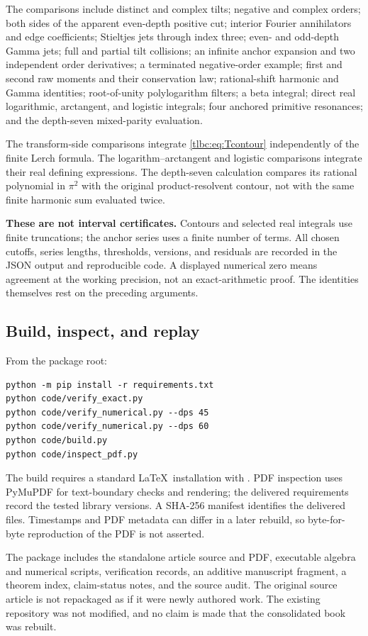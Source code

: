 \documentclass[11pt,letterpaper]{article}
\numberwithin{equation}{section}
\theoremstyle{definition}\newtheorem{definition}[theorem]{Definition}
\theoremstyle{remark}\newtheorem{remark}[theorem]{Remark}
\newcommand{\src}[1]{\texttt{\small\detokenize{#1}}}
\begin{document}
The comparisons include distinct and complex tilts; negative and complex orders; both sides of the apparent even-depth positive cut; interior Fourier annihilators and edge coefficients; Stieltjes jets through index three; even- and odd-depth Gamma jets; full and partial tilt collisions; an infinite anchor expansion and two independent order derivatives; a terminated negative-order example; first and second raw moments and their conservation law; rational-shift harmonic and Gamma identities; root-of-unity polylogarithm filters; a beta integral; direct real logarithmic, arctangent, and logistic integrals; four anchored primitive resonances; and the depth-seven mixed-parity evaluation.

The transform-side comparisons integrate \eqref{tlbc:eq:Tcontour} independently of the finite Lerch formula. The logarithm--arctangent and logistic comparisons integrate their real defining expressions. The depth-seven calculation compares its rational polynomial in $\pi^2$ with the original product-resolvent contour, not with the same finite harmonic sum evaluated twice.

\textbf{These are not interval certificates.} Contours and selected real integrals use finite truncations; the anchor series uses a finite number of terms. All chosen cutoffs, series lengths, thresholds, versions, and residuals are recorded in the JSON output and reproducible code. A displayed numerical zero means agreement at the working precision, not an exact-arithmetic proof. The identities themselves rest on the preceding arguments.

\subsection{Build, inspect, and replay}
From the package root:
\begin{verbatim}
python -m pip install -r requirements.txt
python code/verify_exact.py
python code/verify_numerical.py --dps 45
python code/verify_numerical.py --dps 60
python code/build.py
python code/inspect_pdf.py
\end{verbatim}
The build requires a standard \LaTeX\ installation with \src{pdflatex}. PDF inspection uses PyMuPDF for text-boundary checks and rendering; the delivered requirements record the tested library versions. A SHA-256 manifest identifies the delivered files. Timestamps and PDF metadata can differ in a later rebuild, so byte-for-byte reproduction of the PDF is not asserted.

The package includes the standalone article source and PDF, executable algebra and numerical scripts, verification records, an additive manuscript fragment, a theorem index, claim-status notes, and the source audit. The original source article is not repackaged as if it were newly authored work. The existing repository was not modified, and no claim is made that the consolidated book was rebuilt.
\end{document}

